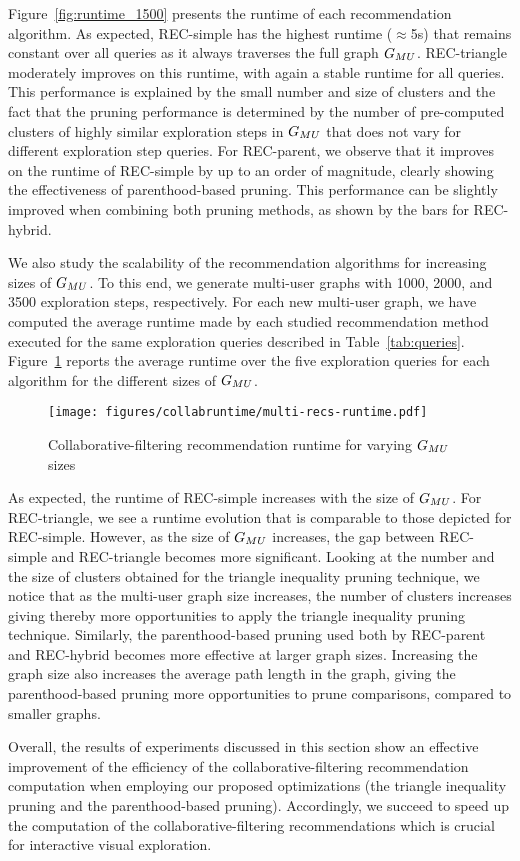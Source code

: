 Figure~\ref{fig:runtime_1500} presents the runtime of each recommendation algorithm. As expected, REC-simple has the highest runtime ($\approx$5s) that remains constant over all queries as it always traverses the full graph $G_{MU}$. 
REC-triangle moderately improves on this runtime, with again a stable runtime for all queries. This performance is explained by the small number and size of clusters and the fact that the pruning performance is determined by the number of pre-computed clusters of highly similar exploration steps in $G_{MU}$ that does not vary for different exploration step queries. For REC-parent, we observe that it improves on the runtime of REC-simple by up to an order of magnitude, clearly showing the effectiveness of parenthood-based pruning. This performance can be slightly improved when combining both pruning methods, as shown by the bars for REC-hybrid. 




We also study the scalability of the recommendation algorithms for increasing sizes of $G_{MU}{}$.
To this end, we generate multi-user graphs with 1000, 2000, and 3500 exploration steps, respectively. 
For each new multi-user graph, we have computed the average runtime made by each studied recommendation method executed for the same exploration queries described in Table~\ref{tab:queries}.
 Figure~\ref{fig:multi-recs-runtime} reports the average runtime over the five exploration queries for each algorithm for the different sizes of $G_{MU}{}$.

 \begin{figure}[t]
\centering
 \texttt{[image: figures/collabruntime/multi-recs-runtime.pdf]}
\caption{Collaborative-filtering recommendation runtime  for varying $G_{MU}{}$ sizes}
\label{fig:multi-recs-runtime}	
\end{figure}

 
As expected, the runtime of REC-simple increases with the size of $G_{MU}{}$.
For REC-triangle, we see a runtime evolution that is comparable to those depicted for REC-simple.
However, as the size of $G_{MU}{}$ increases, the gap between REC-simple and REC-triangle becomes more significant. Looking at the number and the size of clusters obtained for the triangle inequality pruning technique, we notice that as the multi-user graph size increases, the number of clusters increases giving thereby more opportunities to apply the triangle inequality pruning technique. Similarly, the parenthood-based pruning used both by REC-parent and REC-hybrid becomes more effective at larger graph sizes. Increasing the graph size also increases the average path length in the graph, giving the parenthood-based pruning more opportunities to prune comparisons, compared to smaller graphs.





Overall, the results of experiments discussed in this section show an effective improvement of the efficiency of the collaborative-filtering recommendation computation when employing our proposed optimizations (the triangle inequality pruning and the parenthood-based pruning). Accordingly, we succeed to speed up the computation of the collaborative-filtering recommendations which is crucial for interactive visual exploration. 
